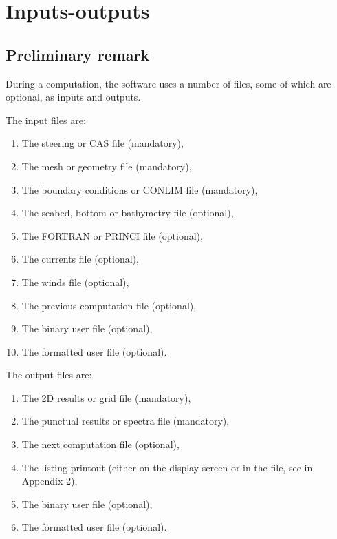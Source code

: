 \chapter{ Inputs-outputs}

\section{ Preliminary remark}

 During a computation, the \tomawac software uses a number of files, some of which are optional, as inputs and outputs.

 The input files are:

\begin{enumerate}
\item  The steering or CAS file (mandatory),

\item  The mesh or geometry file (mandatory),

\item  The boundary conditions or CONLIM file (mandatory),

\item  The seabed, bottom or bathymetry file (optional),

\item  The FORTRAN or PRINCI file (optional),

\item  The currents file (optional),

\item  The winds file (optional),

\item  The previous computation file (optional),

\item  The binary user file (optional),

\item  The formatted user file (optional).
\end{enumerate}

The output files are:

\begin{enumerate}
\item  The 2D results or grid file (mandatory),

\item  The punctual results or spectra file (mandatory),

\item  The next computation file (optional),

\item  The listing printout (either on the display screen or in the file, see in Appendix 2),

\item  The binary user file (optional),

\item  The formatted user file (optional).
\end{enumerate}


